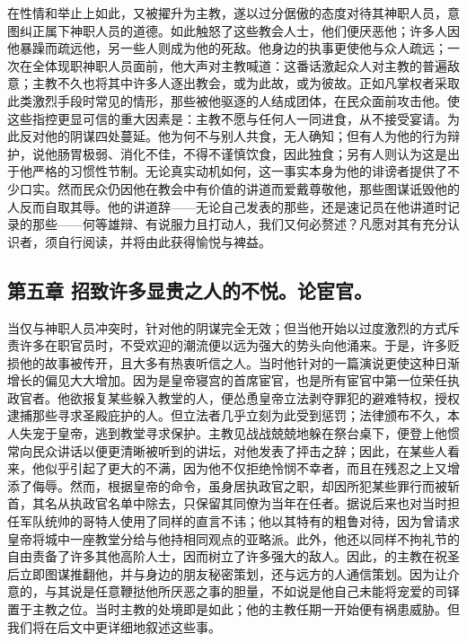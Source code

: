 在性情和举止上如此，又被擢升为主教，遂以过分倨傲的态度对待其神职人员，意图纠正属下神职人员的道德。如此触怒了这些教会人士，他们便厌恶他；许多人因他暴躁而疏远他，另一些人则成为他的死敌。他身边的执事更使他与众人疏远；一次在全体现职神职人员面前，他大声对主教喊道：这番话激起众人对主教的普遍敌意；主教不久也将其中许多人逐出教会，或为此故，或为彼故。正如凡掌权者采取此类激烈手段时常见的情形，那些被他驱逐的人结成团体，在民众面前攻击他。使这些指控更显可信的重大因素是：主教不愿与任何人一同进食，从不接受宴请。为此反对他的阴谋四处蔓延。他为何不与别人共食，无人确知；但有人为他的行为辩护，说他肠胃极弱、消化不佳，不得不谨慎饮食，因此独食；另有人则认为这是出于他严格的习惯性节制。无论真实动机如何，这一事实本身为他的诽谤者提供了不少口实。然而民众仍因他在教会中有价值的讲道而爱戴尊敬他，那些图谋诋毁他的人反而自取其辱。他的讲道辞——无论自己发表的那些，还是速记员在他讲道时记录的那些——何等雄辩、有说服力且打动人，我们又何必赘述？凡愿对其有充分认识者，须自行阅读，并将由此获得愉悦与裨益。\par


\subsection{第五章  招致许多显贵之人的不悦。论宦官。}

当仅与神职人员冲突时，针对他的阴谋完全无效；但当他开始以过度激烈的方式斥责许多在职官员时，不受欢迎的潮流便以远为强大的势头向他涌来。于是，许多贬损他的故事被传开，且大多有热衷听信之人。当时他针对的一篇演说更使这种日渐增长的偏见大大增加。因为是皇帝寝宫的首席宦官，也是所有宦官中第一位荣任执政官者。他欲报复某些躲入教堂的人，便怂恿皇帝立法剥夺罪犯的避难特权，授权逮捕那些寻求圣殿庇护的人。但立法者几乎立刻为此受到惩罚；法律颁布不久，本人失宠于皇帝，逃到教堂寻求保护。主教见战战兢兢地躲在祭台桌下，便登上他惯常向民众讲话以便更清晰被听到的讲坛，对他发表了抨击之辞；因此，在某些人看来，他似乎引起了更大的不满，因为他不仅拒绝怜悯不幸者，而且在残忍之上又增添了侮辱。然而，根据皇帝的命令，虽身居执政官之职，却因所犯某些罪行而被斩首，其名从执政官名单中除去，只保留其同僚为当年在任者。据说后来也对当时担任军队统帅的哥特人使用了同样的直言不讳；他以其特有的粗鲁对待，因为曾请求皇帝将城中一座教堂分给与他持相同观点的亚略派。此外，他还以同样不拘礼节的自由责备了许多其他高阶人士，因而树立了许多强大的敌人。因此，的主教在祝圣后立即图谋推翻他，并与身边的朋友秘密策划，还与远方的人通信策划。因为让介意的，与其说是任意鞭挞他所厌恶之事的胆量，不如说是他自己未能将宠爱的司铎置于主教之位。当时主教的处境即是如此；他的主教任期一开始便有祸患威胁。但我们将在后文中更详细地叙述这些事。\par

